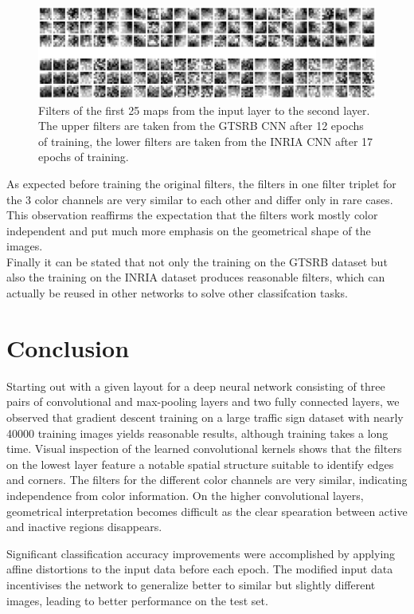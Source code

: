 \documentclass[11pt, a4paper]{article}
\begin{document}
\begin{figure}[h!]
	\centering
	\includegraphics[width=1\textwidth]{gtsrb_vs_inria_filters.png}
	\caption{Filters of the first 25 maps from the input layer to the second layer. The upper filters are taken from the GTSRB CNN after 12 epochs of training, the lower filters are taken from the INRIA CNN after 17 epochs of training.}
	\label{fig:gtsrb_vs_inria_filters}
\end{figure}

As expected before training the original filters, the filters in one filter triplet for the 3 color channels are very similar to each other and differ only in rare cases. This observation reaffirms the expectation that the filters work mostly color independent and put much more emphasis on the geometrical shape of the images.\\
Finally it can be stated that not only the training on the GTSRB dataset but also the training on the INRIA dataset produces reasonable filters, which can actually be reused in other networks to solve other classifcation tasks.


\section{Conclusion}
Starting out with a given layout for a deep neural network consisting of three pairs of convolutional and max-pooling layers and two fully connected layers, we observed that gradient descent training on a large traffic sign dataset with nearly 40000 training images yields reasonable results, although training takes a long time. Visual inspection of the learned convolutional kernels shows that the filters on the lowest layer feature a notable spatial structure suitable to identify edges and corners. The filters for the different color channels are very similar, indicating independence from color information. On the higher convolutional layers, geometrical interpretation becomes difficult as the clear spearation between active and inactive regions disappears.

Significant classification accuracy improvements were accomplished by applying affine distortions to the input data before each epoch. The modified input data incentivises the network to generalize better to similar but slightly different images, leading to better performance on the test set.
\end{document}

